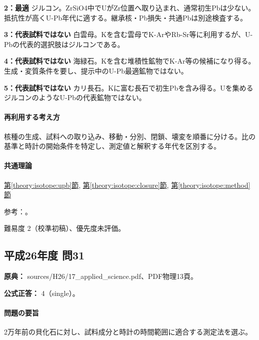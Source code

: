 \noindent\textbf{2：最適} ジルコン。ZrSiO4中でUがZr位置へ取り込まれ、通常初生Pbは少ない。抵抗性が高くU-Pb年代に適する。継承核・Pb損失・共通Pbは別途検査する。\par

\noindent\textbf{3：代表試料ではない} 白雲母。Kを含む雲母でK-ArやRb-Sr等に利用するが、U-Pbの代表的選択肢はジルコンである。\par

\noindent\textbf{4：代表試料ではない} 海緑石。Kを含む堆積性鉱物でK-Ar等の候補になり得る。生成・変質条件を要し、提示中のU-Pb最適鉱物ではない。\par

\noindent\textbf{5：代表試料ではない} カリ長石。Kに富む長石で初生Pbを含み得る。Uを集めるジルコンのようなU-Pbの代表鉱物ではない。\par

\paragraph{再利用する考え方} 核種の生成、試料への取り込み、移動・分別、閉鎖、壊変を順番に分ける。比の基準と時計の開始条件を特定し、測定値と解釈する年代を区別する。

\paragraph{共通理論} \hyperref[theory:isotope:upb]{第\ref*{theory:isotope:upb}節}, \hyperref[theory:isotope:closure]{第\ref*{theory:isotope:closure}節}, \hyperref[theory:isotope:method]{第\ref*{theory:isotope:method}節}

\par 参考：\cite{iso_zircon,iso_radiometric}。

\par 難易度 2（校準初稿）、優先度未評価。

\subsection{平成26年度 問31}
\label{q:h26-reg-applied-31}

\noindent\textbf{原典：} sources/H26/17\_applied\_science.pdf、PDF物理13頁。

\textbf{公式正答：} 4（single）。

\paragraph{問題の要旨} 2万年前の貝化石に対し、試料成分と時計の時間範囲に適合する測定法を選ぶ。

